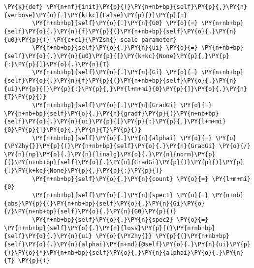 \begin{tcolorbox}[breakable, size=fbox, boxrule=1pt, pad at break*=1mm,colback=cellbackground, colframe=cellborder]
\begin{Verbatim}[commandchars=\\\{\}]
    \PY{k}{def} \PY{n+nf}{init}\PY{p}{(}\PY{n+nb+bp}{self}\PY{p}{,}\PY{n}{verbose}\PY{o}{=}\PY{k+kc}{False}\PY{p}{)}\PY{p}{:}
        \PY{n+nb+bp}{self}\PY{o}{.}\PY{n}{G0} \PY{o}{=} \PY{n+nb+bp}{self}\PY{o}{.}\PY{n}{f}\PY{p}{(}\PY{n+nb+bp}{self}\PY{o}{.}\PY{n}{u0}\PY{p}{)} \PY{c+c1}{\PYZsh{} scale parameter}
        \PY{n+nb+bp}{self}\PY{o}{.}\PY{n}{ui} \PY{o}{=} \PY{n+nb+bp}{self}\PY{o}{.}\PY{n}{u0}\PY{p}{[}\PY{k+kc}{None}\PY{p}{,}\PY{p}{:}\PY{p}{]}\PY{o}{.}\PY{n}{T}
        \PY{n+nb+bp}{self}\PY{o}{.}\PY{n}{Gi} \PY{o}{=} \PY{n+nb+bp}{self}\PY{o}{.}\PY{n}{f}\PY{p}{(}\PY{n+nb+bp}{self}\PY{o}{.}\PY{n}{ui}\PY{p}{[}\PY{p}{:}\PY{p}{,}\PY{l+m+mi}{0}\PY{p}{]}\PY{o}{.}\PY{n}{T}\PY{p}{)}
        \PY{n+nb+bp}{self}\PY{o}{.}\PY{n}{GradGi} \PY{o}{=} \PY{n+nb+bp}{self}\PY{o}{.}\PY{n}{gradf}\PY{p}{(}\PY{n+nb+bp}{self}\PY{o}{.}\PY{n}{ui}\PY{p}{[}\PY{p}{:}\PY{p}{,}\PY{l+m+mi}{0}\PY{p}{]}\PY{o}{.}\PY{n}{T}\PY{p}{)}
        \PY{n+nb+bp}{self}\PY{o}{.}\PY{n}{alphai} \PY{o}{=} \PY{o}{\PYZhy{}}\PY{p}{(}\PY{n+nb+bp}{self}\PY{o}{.}\PY{n}{GradGi} \PY{o}{/} \PY{n}{np}\PY{o}{.}\PY{n}{linalg}\PY{o}{.}\PY{n}{norm}\PY{p}{(}\PY{n+nb+bp}{self}\PY{o}{.}\PY{n}{GradGi}\PY{p}{)}\PY{p}{)}\PY{p}{[}\PY{k+kc}{None}\PY{p}{,}\PY{p}{:}\PY{p}{]}
        \PY{n+nb+bp}{self}\PY{o}{.}\PY{n}{count} \PY{o}{=} \PY{l+m+mi}{0}
        \PY{n+nb+bp}{self}\PY{o}{.}\PY{n}{spec1} \PY{o}{=} \PY{n+nb}{abs}\PY{p}{(}\PY{n+nb+bp}{self}\PY{o}{.}\PY{n}{Gi}\PY{o}{/}\PY{n+nb+bp}{self}\PY{o}{.}\PY{n}{G0}\PY{p}{)}
        \PY{n+nb+bp}{self}\PY{o}{.}\PY{n}{spec2} \PY{o}{=} \PY{n+nb+bp}{self}\PY{o}{.}\PY{n}{loss}\PY{p}{(}\PY{n+nb+bp}{self}\PY{o}{.}\PY{n}{ui} \PY{o}{\PYZhy{}} \PY{p}{(}\PY{n+nb+bp}{self}\PY{o}{.}\PY{n}{alphai}\PY{n+nd}{@self}\PY{o}{.}\PY{n}{ui}\PY{p}{)}\PY{o}{*}\PY{n+nb+bp}{self}\PY{o}{.}\PY{n}{alphai}\PY{o}{.}\PY{n}{T} \PY{p}{)}


\end{Verbatim}
\end{tcolorbox}
